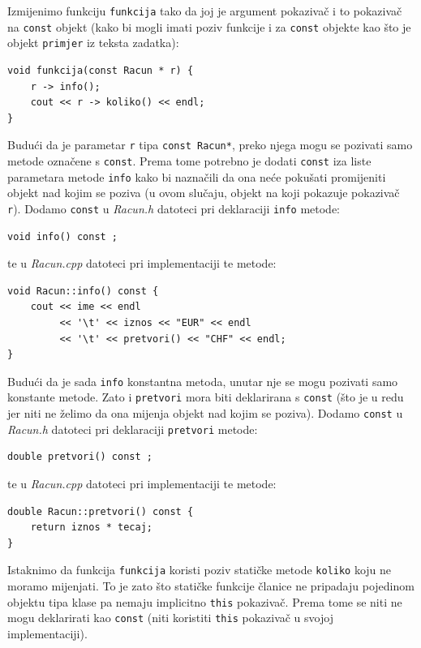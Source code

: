 \begin{rjesenje}
    Izmijenimo funkciju \texttt{funkcija} tako da joj je argument pokazivač i 
    to pokazivač na \texttt{const} objekt
    (kako bi mogli imati poziv funkcije i za \texttt{const} objekte kao što je
    objekt \texttt{primjer} iz teksta zadatka):
\begin{verbatim}
void funkcija(const Racun * r) {
    r -> info();
    cout << r -> koliko() << endl;
}
\end{verbatim}

Budući da je parametar \texttt{r} tipa \texttt{const Racun*}, 
preko njega mogu se pozivati samo metode označene s \texttt{const}. 
Prema tome potrebno je dodati \texttt{const}
iza liste parametara metode \texttt{info}
kako bi naznačili da ona neće pokušati promijeniti objekt nad kojim se poziva (u ovom slučaju, 
objekt na koji pokazuje pokazivač \texttt{r}).
Dodamo \texttt{const} u \textit{Racun.h} datoteci pri deklaraciji \texttt{info} metode:
\begin{verbatim}
void info() const ;
\end{verbatim}
te u \textit{Racun.cpp} datoteci pri implementaciji te metode:
\begin{verbatim}
void Racun::info() const {
    cout << ime << endl
         << '\t' << iznos << "EUR" << endl
         << '\t' << pretvori() << "CHF" << endl;
}
\end{verbatim}
Budući da je sada \texttt{info} konstantna metoda, 
unutar nje se mogu pozivati samo konstante metode. 
Zato i \texttt{pretvori} mora biti deklarirana s \texttt{const} 
(što je u redu jer niti ne želimo da ona mijenja objekt nad kojim se poziva).
Dodamo \texttt{const} u \textit{Racun.h} datoteci pri deklaraciji \texttt{pretvori} metode:
\begin{verbatim}
double pretvori() const ;
\end{verbatim}
te u \textit{Racun.cpp} datoteci pri implementaciji te metode:
\begin{verbatim}
double Racun::pretvori() const {
    return iznos * tecaj;
}
\end{verbatim}
Istaknimo da funkcija \texttt{funkcija}
koristi poziv statičke metode \texttt{koliko}
koju ne moramo mijenjati.
To je zato što statičke funkcije članice ne pripadaju pojedinom
objektu tipa klase pa nemaju implicitno \texttt{this} pokazivač. 
Prema tome se niti ne mogu deklarirati kao \texttt{const} (niti koristiti \texttt{this} pokazivač u svojoj
implementaciji).
\end{rjesenje}

